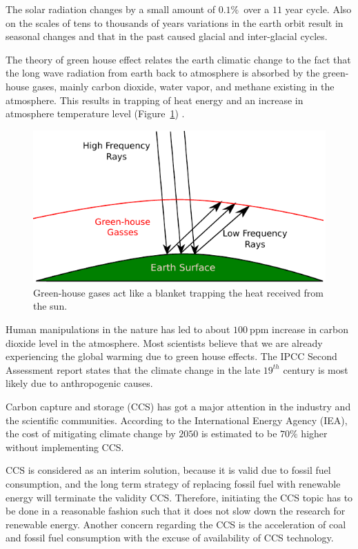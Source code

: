 The solar radiation changes by a small amount of $0.1\%$~over a $11$ year cycle.
Also on the scales of tens to thousands of years variations in the earth orbit
result in seasonal changes and that in the past caused glacial and inter-glacial
cycles.

The theory of green house effect relates the earth climatic change to the fact
that the long wave radiation from earth back to atmosphere is absorbed by the
green-house gases, mainly carbon dioxide, water vapor, and methane existing in
the atmosphere. This results in trapping of heat energy and an increase in
atmosphere temperature level (Figure~\ref{fig:grHsGs})
\cite{foukal2006variations}.

\begin{figure}
  \centering
  \includegraphics[width=0.65 \linewidth]{./figurer/G-H_gasses} 
  \caption{Green-house gases act like a blanket trapping the heat received from
the sun.}
  \label{fig:grHsGs}
%
\end{figure}

Human manipulations in the nature has led to about $100~\mbox{ppm}$ increase in
carbon dioxide level in the atmosphere. Most scientists believe that we are
already experiencing the global warming due to green house effects. The IPCC
Second Assessment report states that the climate change in the late $19^{th}$
century is most likely due to anthropogenic causes. 

Carbon capture and storage (CCS) has got a major attention in the industry and
the scientific communities. According to the International Energy Agency (IEA),
the cost of mitigating climate change by $2050$ is estimated to be $70\%$ higher
without implementing CCS.

CCS is considered as an interim solution, because it is valid due to fossil fuel
consumption, and the long term strategy of replacing fossil fuel with renewable
energy will terminate the validity CCS. Therefore, initiating the CCS topic has
to be done in a reasonable fashion such that it does not slow down the research
for renewable energy. Another concern regarding the CCS is the acceleration of
coal and fossil fuel consumption with the excuse of availability of CCS
technology.

